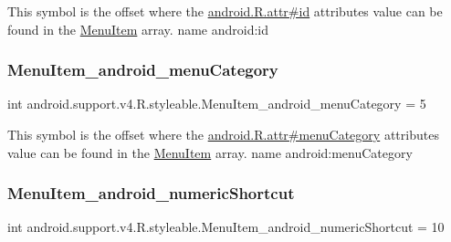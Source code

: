 This symbol is the offset where the \hyperlink{}{android.\+R.\+attr\#id} attribute\textquotesingle{}s value can be found in the \hyperlink{classandroid_1_1support_1_1v4_1_1R_1_1styleable_a4234e016636b99c0c3d9cfc512903697}{Menu\+Item} array.  name android\+:id \mbox{\label{classandroid_1_1support_1_1v4_1_1R_1_1styleable_a8ac9469c005cff049480dd49956827cf}} 
\subsubsection{\texorpdfstring{Menu\+Item\+\_\+android\+\_\+menu\+Category}{MenuItem\_android\_menuCategory}}
{\footnotesize\ttfamily int android.\+support.\+v4.\+R.\+styleable.\+Menu\+Item\+\_\+android\+\_\+menu\+Category = 5\hspace{0.3cm}{\ttfamily [static]}}

This symbol is the offset where the \hyperlink{}{android.\+R.\+attr\#menu\+Category} attribute\textquotesingle{}s value can be found in the \hyperlink{classandroid_1_1support_1_1v4_1_1R_1_1styleable_a4234e016636b99c0c3d9cfc512903697}{Menu\+Item} array.  name android\+:menu\+Category \mbox{\label{classandroid_1_1support_1_1v4_1_1R_1_1styleable_a1f4749c61207ae550ca1399836eee0d3}} 
\subsubsection{\texorpdfstring{Menu\+Item\+\_\+android\+\_\+numeric\+Shortcut}{MenuItem\_android\_numericShortcut}}
{\footnotesize\ttfamily int android.\+support.\+v4.\+R.\+styleable.\+Menu\+Item\+\_\+android\+\_\+numeric\+Shortcut = 10\hspace{0.3cm}{\ttfamily [static]}}

